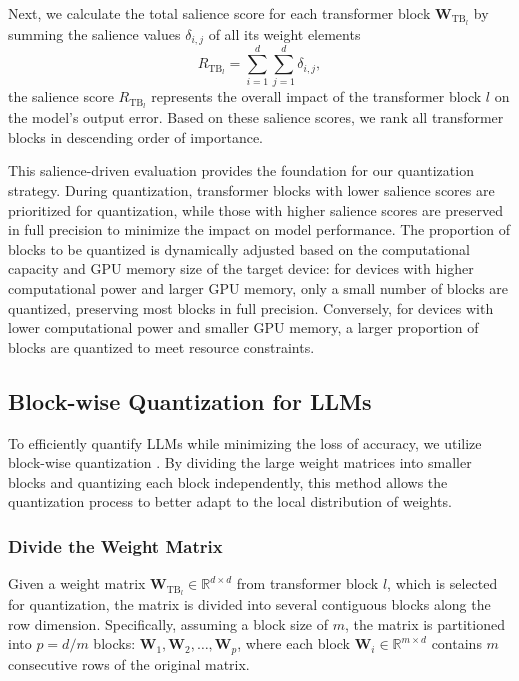 \documentclass[journal]{IEEEtran}
\begin{document}
Next, we calculate the total salience score for each transformer block \( \mathbf{W}_{\text{TB}_l} \) by summing the salience values \( \delta_{i,j} \) of all its weight elements
\begin{equation}
R_{\text{TB}_l} = \sum_{i=1}^d \sum_{j=1}^d \delta_{i,j},
\end{equation}
the salience score \( R_{\text{TB}_l} \) represents the overall impact of the transformer block $l$ on the model's output error. Based on these salience scores, we rank all transformer blocks in descending order of importance.

This salience-driven evaluation provides the foundation for our quantization strategy. During quantization, transformer blocks with lower salience scores are prioritized for quantization, while those with higher salience scores are preserved in full precision to minimize the impact on model performance. 
The proportion of blocks to be quantized is dynamically adjusted based on the computational capacity and GPU memory size of the target device: for devices with higher computational power and larger GPU memory, only a small number of blocks are quantized, preserving most blocks in full precision. Conversely, for devices with lower computational power and smaller GPU memory, a larger proportion of blocks are quantized to meet resource constraints.



\subsection{Block-wise Quantization for LLMs}
To efficiently quantify LLMs while minimizing the loss of accuracy, we utilize block-wise quantization \cite{tim2022llm,frantar2022gptq}. By dividing the large weight matrices into smaller blocks and quantizing each block independently, this method allows the quantization process to better adapt to the local distribution of weights.

\subsubsection{Divide the Weight Matrix}
Given a weight matrix \( \mathbf{W}_{\text{TB}_l} \in \mathbb{R}^{d \times d} \) from transformer block \( l \), which is selected for quantization, the matrix is divided into several contiguous blocks along the row dimension. Specifically, assuming a block size of \( m \), the matrix is partitioned into \( p = d / m \) blocks: \( \mathbf{W}_1, \mathbf{W}_2, \dots, \mathbf{W}_p \), where each block \( \mathbf{W}_i \in \mathbb{R}^{m \times d} \) contains \( m \) consecutive rows of the original matrix.
\end{document}
